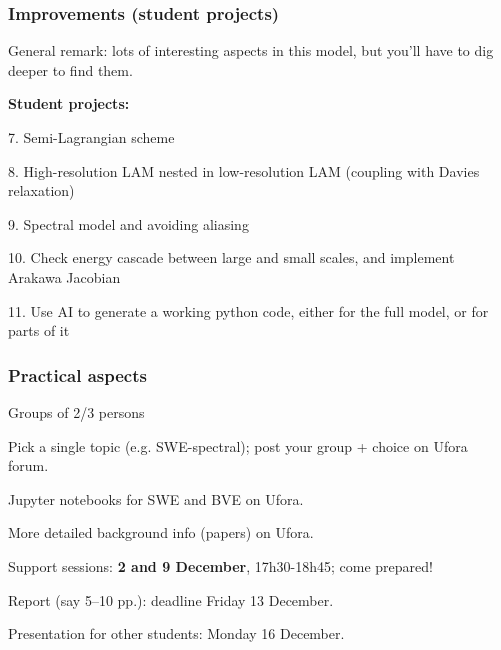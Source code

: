 \documentclass[aspectratio=43,9pt]{beamer}
\begin{document}
%
%
\begin{frame}
	\frametitle{Improvements (student projects)}
	General remark: lots of interesting aspects in this model, but you'll have to dig deeper to find them.
	\par\vspace*{4ex}
	{\bf Student projects:}
	\begin{myitemize}{1ex}
		\item[7.] Semi-Lagrangian scheme
		\item[8.] High-resolution LAM nested in low-resolution LAM (coupling with Davies relaxation)
		\item[9.] Spectral model and avoiding aliasing
		\item[10.] Check energy cascade between large and small scales, and implement Arakawa Jacobian
		\item[11.] Use AI to generate a working python code, either for the full model, or for parts of it
	\end{myitemize}
\end{frame}
%
%
\begin{frame}
	\frametitle{Practical aspects}
	\begin{myitemize}{2ex}
		\item Groups of 2/3 persons
		\item Pick a single topic (e.g. SWE-spectral); post your group + choice on Ufora forum.
		\item Jupyter notebooks for SWE and BVE on Ufora.
		\item More detailed background info (papers) on Ufora.
		\item Support sessions: \textbf{2 and 9 December}, 17h30-18h45; come prepared!
		\item Report (say 5--10 pp.): deadline Friday 13 December.
		\item Presentation for other students: Monday 16 December.
	\end{myitemize}
\end{frame}
%
%
\end{document}

